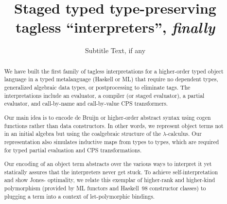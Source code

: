 \documentclass[preprint]{sigplanconf}
\begin{document}
\copyrightdata{[to be supplied]} 


\title{Staged typed type-preserving tagless ``interpreters'', \emph{finally}}
\subtitle{Subtitle Text, if any}

\begin{comment}
\authorinfo{Jacques Carette}
           {McMaster University}
           {carette@mcmaster.ca}
\authorinfo{Oleg Kiselyov}
           {FNMOC}
           {oleg@pobox.com}
\authorinfo{Chung-chieh Shan}
           {Rutgers University}
           {ccshan@cs.rutgers.edu}
\end{comment}
\authorinfo{}{}{}

\maketitle

\begin{abstract}
We have built the first family of tagless interpretations for a
higher-order typed object
language in a typed metalanguage (Haskell or ML) that
require no dependent
types, generalized algebraic data types, or
postprocessing to eliminate tags.
The interpretations include
an evaluator, a compiler (or staged evaluator), a partial
evaluator, and call-by-name and
call-by-value CPS transformers.

Our main idea is to encode
de Bruijn or higher-order abstract syntax
using cogen functions rather than data constructors.
In other words, we represent object terms not in an initial algebra
but using the coalgebraic structure of the $\lambda$-calculus.
Our representation also simulates inductive maps from types to
types, which are required for typed partial evaluation and CPS transformations.

Our encoding of an object term abstracts over the various ways to
interpret it yet statically assures that the interpreters never get
stuck.  To achieve self\hyp interpretation and show Jones\hyp
optimality, we relate this exemplar of higher-rank and higher-kind
polymorphism (provided by ML functors and Haskell~98 constructor
classes) to plugging a term into a context of let\hyp polymorphic
bindings.
\end{abstract}

\end{document}
